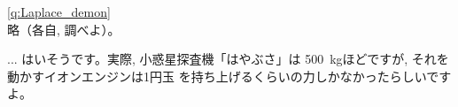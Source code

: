 %
\ref{q:Laplace_demon}\\
略（各自, 調べよ）。
\hv


\begin{faq}{\small{} ... 
はいそうです。実際, 小惑星探査機「はやぶさ」は
500~kgほどですが, それを動かすイオンエンジンは1円玉
を持ち上げるくらいの力しかなかったらしいですよ。}\end{faq}

